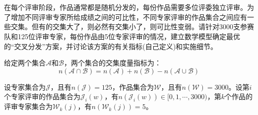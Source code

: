 \documentclass[12pt, onecolumn]{article}
\title{\normf{基于连续时间的LiDAR/Camera/IMU的时空标定方法}}
\author{\normf{陈烁龙}}
\date{\normf{\today}}
\newcommand\normf{\fangsong}
\begin{document}
	
	\maketitle
	\thispagestyle{empty}
	\clearpage
	
	\tableofcontents
	\newpage
	\listoffigures
	\newpage
	\listoftables
	
	\clearpage
	\setcounter{page}{1}
	
	\section{\normf{交叉分配方案}}
	\normf
	在每个评审阶段，作品通常都是随机分发的，每份作品需要多位评委独立评审。为了增加不同评审专家所给成绩之间的可比性，不同专家评审的作品集合之间应有一些交集。但有的交集大了，则必然有交集小了，则可比性变弱。请针对3000支参赛队和125位评审专家，每份作品由5位专家评审的情况，建立数学模型确定最优的“交叉分发”方案，并讨论该方案的有关指标(自己定义)和实施细节。
	
	给定两个集合$\mathcal{A}$和$\mathcal{B}$，两个集合的交集度量指标为：
	\begin{equation*}
	n\left( \mathcal{A}\cap\mathcal{B}\right) =n\left(\mathcal{A} \right)+ n\left(\mathcal{B} \right)-n\left( \mathcal{A}\cup\mathcal{B}\right)
	\end{equation*}
	
	设专家集合为$\mathcal{J}$，且有$n(\mathcal{J})=125$，作品集合为$\mathcal{W}$，且有$n(\mathcal{W})=3000$。设第$i$个专家评审的作品集合为$\mathcal{J}_i(w)$，有$n(\mathcal{J}_i(w))\in[0,1,\cdots,3000)$，第$k$个作品的评审专家集合为$\mathcal{W}_k(j)$，有$n(\mathcal{W}_k(j))=5$。
	
\end{document}
